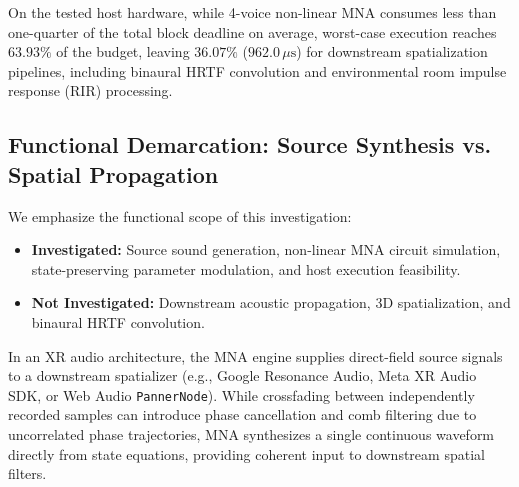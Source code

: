 \documentclass[fleqn,final]{jaes}
\begin{document}
\begin{table}[h]
\caption{Audio Block Budget Allocation Context (128 samples @ 48~kHz, $T_{\text{budget}} = 2,666.67\,\mu\text{s}$).}
\label{tab:xr_budget}
\centering
{}
\end{table}

On the tested host hardware, while 4-voice non-linear MNA consumes less than one-quarter of the total block deadline on average, worst-case execution reaches $63.93\%$ of the budget, leaving $36.07\%$ ($962.0\,\mu\text{s}$) for downstream spatialization pipelines, including binaural HRTF convolution and environmental room impulse response (RIR) processing.

\subsection{Functional Demarcation: Source Synthesis vs. Spatial Propagation}
We emphasize the functional scope of this investigation:
\begin{itemize}
\item \textbf{Investigated:} Source sound generation, non-linear MNA circuit simulation, state-preserving parameter modulation, and host execution feasibility.
\item \textbf{Not Investigated:} Downstream acoustic propagation, 3D spatialization, and binaural HRTF convolution.
\end{itemize}

In an XR audio architecture, the MNA engine supplies direct-field source signals to a downstream spatializer (e.g., Google Resonance Audio, Meta XR Audio SDK, or Web Audio \texttt{PannerNode}). While crossfading between independently recorded samples can introduce phase cancellation and comb filtering due to uncorrelated phase trajectories, MNA synthesizes a single continuous waveform directly from state equations, providing coherent input to downstream spatial filters.
\end{document}
